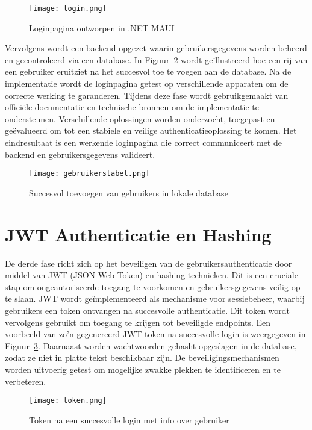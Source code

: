 \begin{figure}[H]
    \centering
    \texttt{[image: login.png]}
    \caption{Loginpagina ontworpen in .NET MAUI}
    \label{fig:loginpagina}
\end{figure}

Vervolgens wordt een backend opgezet waarin gebruikersgegevens worden beheerd en gecontroleerd via een database. In Figuur~\ref{fig:gebruikerstabel} wordt geïllustreerd hoe een rij van een gebruiker eruitziet na het succesvol toe te voegen aan de database. Na de implementatie wordt de loginpagina getest op verschillende apparaten om de correcte werking te garanderen. Tijdens deze fase wordt gebruikgemaakt van officiële documentatie en technische bronnen om de implementatie te ondersteunen. Verschillende oplossingen worden onderzocht, toegepast en geëvalueerd om tot een stabiele en veilige authenticatieoplossing te komen. Het eindresultaat is een werkende loginpagina die correct communiceert met de backend en gebruikersgegevens valideert.

\begin{figure}[H]
    \centering
    \texttt{[image: gebruikerstabel.png]}
    \caption{Succesvol toevoegen van gebruikers in lokale database}
    \label{fig:gebruikerstabel}
\end{figure}

\section{JWT Authenticatie en Hashing}

De derde fase richt zich op het beveiligen van de gebruikersauthenticatie door middel van JWT (JSON Web Token) en hashing-technieken. Dit is een cruciale stap om ongeautoriseerde toegang te voorkomen en gebruikersgegevens veilig op te slaan. JWT wordt geïmplementeerd als mechanisme voor sessiebeheer, waarbij gebruikers een token ontvangen na succesvolle authenticatie. Dit token wordt vervolgens gebruikt om toegang te krijgen tot beveiligde endpoints. Een voorbeeld van zo’n gegenereerd JWT-token na succesvolle login is weergegeven in Figuur~\ref{fig:token}. Daarnaast worden wachtwoorden gehasht opgeslagen in de database, zodat ze niet in platte tekst beschikbaar zijn. De beveiligingsmechanismen worden uitvoerig getest om mogelijke zwakke plekken te identificeren en te verbeteren. \\

\begin{figure}[H]
    \centering
    \texttt{[image: token.png]}
    \caption{Token na een succesvolle login met info over gebruiker}
    \label{fig:token}
\end{figure}


